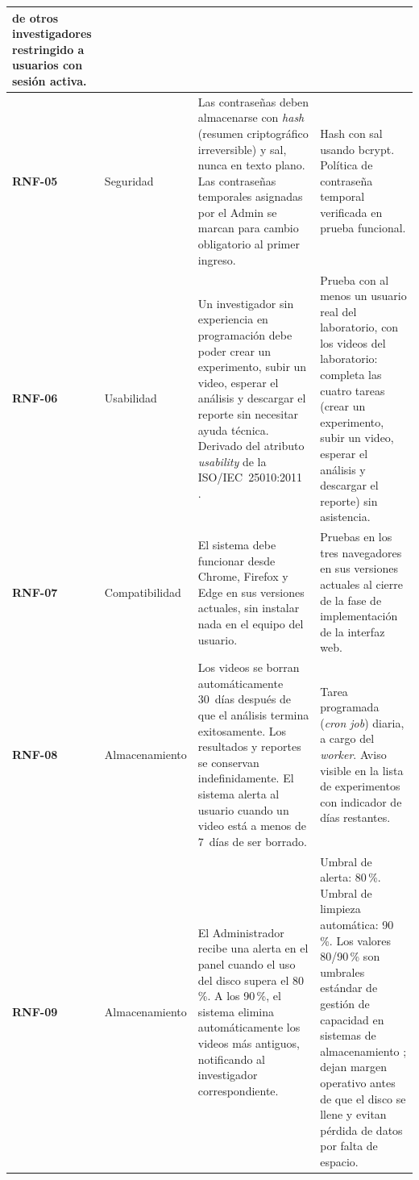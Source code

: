 \begin{longtable}{|>{\bfseries}p{1.2cm}|>{\raggedright}p{2.9cm}|>{\raggedright}p{5.2cm}|>{\raggedright\arraybackslash}p{3.8cm}|}
         de otros investigadores restringido a usuarios con sesión activa. \\
\hline
RNF-05 & Seguridad
       & Las contraseñas deben almacenarse con \textit{hash} (resumen criptográfico irreversible) y sal, nunca en texto plano.
         Las contraseñas temporales asignadas por el Admin se marcan para cambio
         obligatorio al primer ingreso.
       & Hash con sal usando bcrypt. Política de contraseña temporal verificada
         en prueba funcional. \\
\hline
RNF-06 & Usabilidad
       & Un investigador sin experiencia en programación debe poder crear un
         experimento, subir un video, esperar el análisis y descargar el reporte
         sin necesitar ayuda técnica. Derivado del atributo \textit{usability} de
         la ISO/IEC~25010:2011 \cite{iso25010}.
       & Prueba con al menos un usuario real del laboratorio, con los videos del
         laboratorio: completa las cuatro tareas (crear un experimento, subir un video,
         esperar el análisis y descargar el reporte) sin asistencia. \\
\hline
RNF-07 & Compatibilidad
       & El sistema debe funcionar desde Chrome, Firefox y Edge en sus versiones
         actuales, sin instalar nada en el equipo del usuario.
       & Pruebas en los tres navegadores en sus versiones actuales al cierre de
         la fase de implementación de la interfaz web. \\
\hline
RNF-08 & Almacenamiento
       & Los videos se borran automáticamente 30~días después de que el análisis
         termina exitosamente. Los resultados y reportes se conservan
         indefinidamente. El sistema alerta al usuario cuando un video está a menos
         de 7~días de ser borrado.
       & Tarea programada (\textit{cron job}) diaria, a cargo del \textit{worker}. Aviso visible en la lista de experimentos
         con indicador de días restantes. \\
\hline
RNF-09 & Almacenamiento
       & El Administrador recibe una alerta en el panel cuando el uso del disco
         supera el 80\,\%. A los 90\,\%, el sistema elimina automáticamente los
         videos más antiguos, notificando al investigador correspondiente.
       & Umbral de alerta: 80\,\%. Umbral de limpieza automática: 90\,\%.
         Los valores 80/90\,\% son umbrales estándar de gestión de capacidad
         en sistemas de almacenamiento \cite{pressman2014}; dejan margen
         operativo antes de que el disco se llene y evitan pérdida de datos
         por falta de espacio. \\

\end{longtable}
